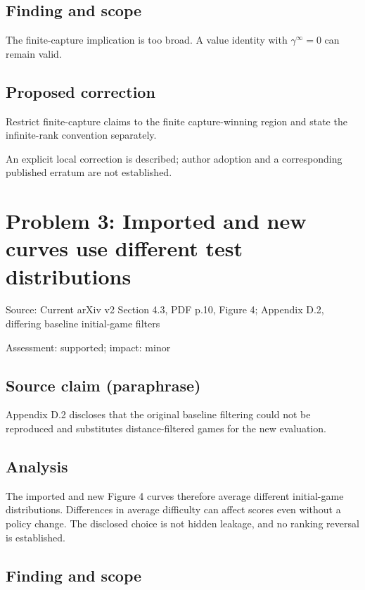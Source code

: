 \documentclass[11pt]{article}
\begin{document}
\subsection*{Finding and scope}

The finite-capture implication is too broad. A value identity with \(\gamma^{\infty}=0\) can remain valid.

\subsection*{Proposed correction}

Restrict finite-capture claims to the finite capture-winning region and state the infinite-rank convention separately.

An explicit local correction is described; author adoption and a corresponding published erratum are not established.

\section*{Problem 3: Imported and new curves use different test distributions}

Source: Current arXiv v2 Section 4.3, PDF p.10, Figure 4; Appendix D.2, differing baseline initial-game filters

Assessment: supported; impact: minor

\subsection*{Source claim (paraphrase)}

Appendix D.2 discloses that the original baseline filtering could not be reproduced and substitutes distance-filtered games for the new evaluation.

\subsection*{Analysis}

The imported and new Figure 4 curves therefore average different initial-game distributions. Differences in average difficulty can affect scores even without a policy change. The disclosed choice is not hidden leakage, and no ranking reversal is established.

\subsection*{Finding and scope}
\end{document}
